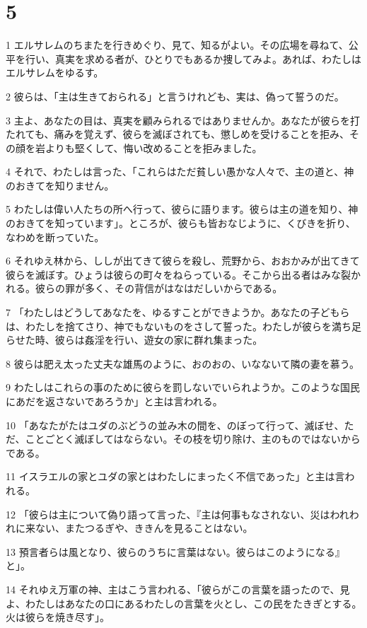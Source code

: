 \chapter{5}

\par 1 エルサレムのちまたを行きめぐり、見て、知るがよい。その広場を尋ねて、公平を行い、真実を求める者が、ひとりでもあるか捜してみよ。あれば、わたしはエルサレムをゆるす。
\par 2 彼らは、「主は生きておられる」と言うけれども、実は、偽って誓うのだ。
\par 3 主よ、あなたの目は、真実を顧みられるではありませんか。あなたが彼らを打たれても、痛みを覚えず、彼らを滅ぼされても、懲しめを受けることを拒み、その顔を岩よりも堅くして、悔い改めることを拒みました。
\par 4 それで、わたしは言った、「これらはただ貧しい愚かな人々で、主の道と、神のおきてを知りません。
\par 5 わたしは偉い人たちの所へ行って、彼らに語ります。彼らは主の道を知り、神のおきてを知っています」。ところが、彼らも皆おなじように、くびきを折り、なわめを断っていた。
\par 6 それゆえ林から、ししが出てきて彼らを殺し、荒野から、おおかみが出てきて彼らを滅ぼす。ひょうは彼らの町々をねらっている。そこから出る者はみな裂かれる。彼らの罪が多く、その背信がはなはだしいからである。
\par 7 「わたしはどうしてあなたを、ゆるすことができようか。あなたの子どもらは、わたしを捨てさり、神でもないものをさして誓った。わたしが彼らを満ち足らせた時、彼らは姦淫を行い、遊女の家に群れ集まった。
\par 8 彼らは肥え太った丈夫な雄馬のように、おのおの、いなないて隣の妻を慕う。
\par 9 わたしはこれらの事のために彼らを罰しないでいられようか。このような国民にあだを返さないであろうか」と主は言われる。
\par 10 「あなたがたはユダのぶどうの並み木の間を、のぼって行って、滅ぼせ、ただ、ことごとく滅ぼしてはならない。その枝を切り除け、主のものではないからである。
\par 11 イスラエルの家とユダの家とはわたしにまったく不信であった」と主は言われる。
\par 12 「彼らは主について偽り語って言った、『主は何事もなされない、災はわれわれに来ない、またつるぎや、ききんを見ることはない。
\par 13 預言者らは風となり、彼らのうちに言葉はない。彼らはこのようになる』と」。
\par 14 それゆえ万軍の神、主はこう言われる、「彼らがこの言葉を語ったので、見よ、わたしはあなたの口にあるわたしの言葉を火とし、この民をたきぎとする。火は彼らを焼き尽す」。
